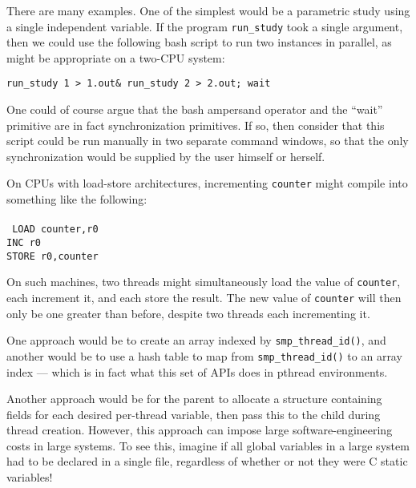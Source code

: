 
	   There are many examples.
	   One of the simplest would be a parametric study using a
	   single independent variable.
	   If the program {\tt run\_study} took a single argument,
	   then we could use the following bash script to run two
	   instances in parallel, as might be appropriate on a
	   two-CPU system:

	   { \scriptsize \tt run\_study 1 > 1.out\& run\_study 2 > 2.out; wait}

	   One could of course argue that the bash ampersand operator and
	   the ``wait'' primitive are in fact synchronization primitives.
	   If so, then consider that 
	   this script could be run manually in two separate
	   command windows, so that the only synchronization would be
	   supplied by the user himself or herself.


	On CPUs with load-store architectures, incrementing {\tt counter}
	might compile into something like the following: \\
	\\
	{\tt
	LOAD counter,r0 \\
	INC r0 \\
	STORE r0,counter \\
	}

	On such machines, two threads might simultaneously load the
	value of {\tt counter}, each increment it, and each store the
	result.
	The new value of {\tt counter} will then only be one greater
	than before, despite two threads each incrementing it.


	One approach would be to create an array indexed by
	{\tt smp\_thread\_id()}, and another would be to use a hash
	table to map from {\tt smp\_thread\_id()} to an array
	index --- which is in fact what this
	set of APIs does in pthread environments.

	Another approach would be for the parent to allocate a structure
	containing fields for each desired per-thread variable, then
	pass this to the child during thread creation.
	However, this approach can impose large software-engineering
	costs in large systems.
	To see this, imagine if all global variables in a large system
	had to be declared in a single file, regardless of whether or
	not they were C static variables!

